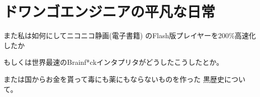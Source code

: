 
\chapter*{ドワンゴエンジニアの平凡な日常}

\lettrine{ま}
た私は如何にしてニコニコ静画(電子書籍)
のFlash版プレイヤーを200\%高速化したか

もしくは世界最速のBrainf*ckインタプリタがどうしたこうしたとか。

または国からお金を貰って毒にも薬にもならないものを作った
黒歴史について。
